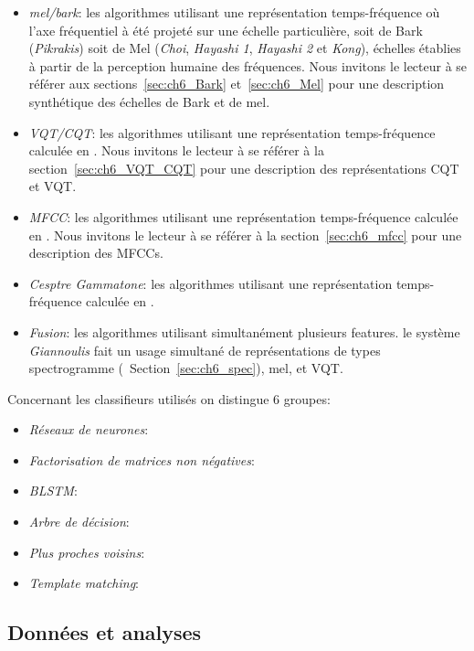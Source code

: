 \begin{itemize}
\item \emph{mel/bark}: les algorithmes utilisant une représentation temps-fréquence où l'axe fréquentiel à été projeté sur une échelle particulière, soit de Bark (\emph{Pikrakis}) soit de Mel (\emph{Choi}, \emph{Hayashi 1}, \emph{Hayashi 2} et \emph{Kong}), échelles établies à partir de la perception humaine des fréquences. Nous invitons le lecteur à se référer aux sections~\ref{sec:ch6_Bark} et~\ref{sec:ch6_Mel} pour une description synthétique des échelles de Bark et de mel.
\item \emph{VQT/CQT}: les algorithmes utilisant une représentation temps-fréquence calculée en . Nous invitons le lecteur à se référer à la section~\ref{sec:ch6_VQT_CQT} pour une description des représentations CQT et VQT.
\item \emph{MFCC}: les algorithmes utilisant une représentation temps-fréquence calculée en . Nous invitons le lecteur à se référer à la section~\ref{sec:ch6_mfcc} pour une description des MFCCs.
\item \emph{Cesptre Gammatone}: les algorithmes utilisant une représentation temps-fréquence calculée en .
\item \emph{Fusion}: les algorithmes utilisant simultanément plusieurs features. le système \emph{Giannoulis}  fait un usage simultané de représentations de types spectrogramme (\cf~Section~\ref{sec:ch6_spec}), mel, et VQT.
\end{itemize}

Concernant les classifieurs utilisés on distingue 6 groupes:

\begin{itemize}
\item \emph{Réseaux de neurones}:
\item \emph{Factorisation de matrices non négatives}:
\item \emph{BLSTM}:
\item \emph{Arbre de décision}:
\item \emph{Plus proches voisins}:
\item \emph{Template matching}:
\end{itemize}


\subsection{Données et analyses}

